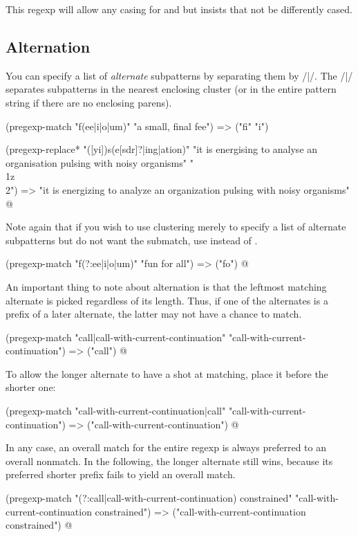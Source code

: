 {

\n This regexp will allow any casing for 
and  but insists that  not be
differently cased.

\subsection{Alternation}
\label{alternation}

You can specify a list of {\em alternate}
subpatterns by separating them by \p/|/.   The \p/|/
separates subpatterns in the nearest enclosing cluster
(or in the entire pattern string if there are no
enclosing parens).

\q@
(pregexp-match "f(ee|i|o|um)" "a small, final fee")
=> ("fi" "i")

(pregexp-replace* "([yi])s(e[sdr]?|ing|ation)"
   "it is energising to analyse an organisation
   pulsing with noisy organisms"
   "\\1z\\2")
=> "it is energizing to analyze an organization
   pulsing with noisy organisms"
@

Note again that if you wish
to use clustering merely to specify a list of alternate
subpatterns but do not want the submatch, use 
instead of \p{(}.

\q@
(pregexp-match "f(?:ee|i|o|um)" "fun for all")
=> ("fo")
@

An important thing to note about alternation is that
the leftmost matching alternate is picked regardless of
its length.  Thus, if one of the alternates is a prefix
of a later alternate, the latter may not have
a chance to match.

\q@
(pregexp-match "call|call-with-current-continuation"
  "call-with-current-continuation")
=> ("call")
@

To allow the longer alternate to have a shot at
matching, place it before the shorter one:

\q@
(pregexp-match "call-with-current-continuation|call"
  "call-with-current-continuation")
=> ("call-with-current-continuation")
@

In any case, an overall match for the entire regexp is
always preferred to an overall nonmatch.  In the
following, the longer alternate still wins, because its
preferred shorter prefix fails to yield an overall
match.

\q@
(pregexp-match "(?:call|call-with-current-continuation) constrained"
  "call-with-current-continuation constrained")
=> ("call-with-current-continuation constrained")
@

}
